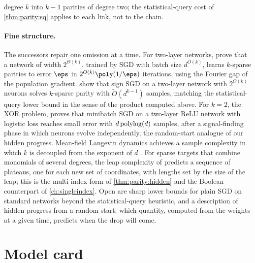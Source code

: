 \begin{refsection}
degree $k$ into $k-1$ parities of degree two; the statistical-query cost of \cref{thm:parity:sq} applies to each link, not to the chain.

\paragraph{Fine structure.}
The successors repair one omission at a time. For two-layer networks, \textcite{BarakEtAl2022} prove that a network of width $2^{\Theta(k)}$, trained by SGD with batch size $d^{O(k)}$, learns $k$-sparse parities to error $\eps$ in $2^{O(k)}\poly(1/\eps)$ iterations, using the Fourier gap of the population gradient. \Textcite{KouEtAl2024} show that sign SGD on a two-layer network with $2^{\Theta(k)}$ neurons solves $k$-sparse parity with $\tilde O(d^{k-1})$ samples, matching the statistical-query lower bound in the sense of the product computed above. For $k=2$, the XOR problem, \textcite{Glasgow2024} proves that minibatch SGD on a two-layer ReLU network with logistic loss reaches small error with $d\operatorname{polylog}(d)$ samples, after a signal-finding phase in which neurons evolve independently, the random-start analogue of our hidden progress. Mean-field Langevin dynamics achieves a sample complexity in which $k$ is decoupled from the exponent of $d$ \parencite{SuzukiEtAl2023}. For sparse targets that combine monomials of several degrees, the leap complexity of \textcite{AbbeBoixAdseraMisiakiewicz2023} predicts a sequence of plateaus, one for each new set of coordinates, with lengths set by the size of the leap; this is the multi-index form of \cref{thm:parity:hidden} and the Boolean counterpart of \cref{ch:singleindex}. Open are sharp lower bounds for plain SGD on standard networks beyond the statistical-query heuristic, and a description of hidden progress from a random start: which quantity, computed from the weights at a given time, predicts when the drop will come.

\section{Model card}\label{sec:parity:card}


\end{refsection}

